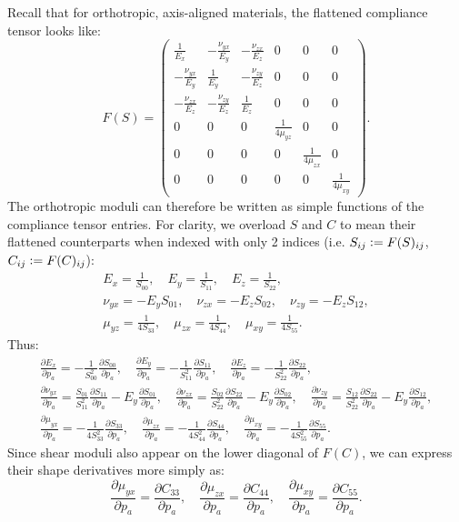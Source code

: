 \documentclass[10pt]{article}
\providecommand{\pder}[2]{\frac{\partial #1}{\partial #2}}
\newcommand{\defeq}{\vcentcolon=}
\begin{document}
Recall that for orthotropic, axis-aligned materials, the flattened compliance
tensor looks like:
$$
F(S) = \begin{pmatrix}
    \frac{1}{E_x} & -\frac{\nu_{yx}}{E_y} & -\frac{\nu_{zx}}{E_z} & 0 & 0 & 0 \\
    -\frac{\nu_{yx}}{E_y} & \frac{1}{E_y} & -\frac{\nu_{zy}}{E_z} & 0 & 0 & 0 \\
    -\frac{\nu_{zx}}{E_z} & -\frac{\nu_{zy}}{E_z} & \frac{1}{E_z} & 0 & 0 & 0 \\
    0 & 0 & 0 & \frac{1}{4 \mu_{yz}} & 0 & 0 \\
    0 & 0 & 0 & 0 & \frac{1}{4 \mu_{zx}} & 0 \\
    0 & 0 & 0 & 0 & 0 & \frac{1}{4 \mu_{xy}}
\end{pmatrix}.
$$
The orthotropic moduli can therefore be written as simple functions of the
compliance tensor entries. For clarity, we overload $S$ and $C$ to mean their
flattened counterparts when indexed with only 2 indices (i.e. $S_{ij} \defeq
F(S)_{ij}$, $C_{ij} \defeq F(C)_{ij}$):
\begin{gather*}
E_x = \frac{1}{S_{00}}, \quad
E_y = \frac{1}{S_{11}}, \quad
E_z = \frac{1}{S_{22}}, \\
\nu_{yx} = -E_y S_{01}, \quad
\nu_{zx} = -E_z S_{02}, \quad
\nu_{zy} = -E_z S_{12}, \\
\mu_{yz} = \frac{1}{4 S_{33}}, \quad
\mu_{zx} = \frac{1}{4 S_{44}}, \quad
\mu_{xy} = \frac{1}{4 S_{55}}.
\end{gather*}
Thus:
\begin{gather*}
    \pder{E_x}{p_a} = -\frac{1}{S_{00}^2} \pder{S_{00}}{p_a}, \quad
    \pder{E_y}{p_a} = -\frac{1}{S_{11}^2} \pder{S_{11}}{p_a}, \quad
    \pder{E_z}{p_a} = -\frac{1}{S_{22}^2} \pder{S_{22}}{p_a}, \\
    \pder{\nu_{yx}}{p_a} = \frac{S_{01}}{S_{11}^2} \pder{S_{11}}{p_a} - E_y \pder{S_{01}}{p_a}, \quad
    \pder{\nu_{zx}}{p_a} = \frac{S_{02}}{S_{22}^2} \pder{S_{22}}{p_a} - E_y \pder{S_{02}}{p_a}, \quad
    \pder{\nu_{zy}}{p_a} = \frac{S_{12}}{S_{22}^2} \pder{S_{22}}{p_a} - E_y \pder{S_{12}}{p_a}, \\
    \pder{\mu_{yx}}{p_a} = -\frac{1}{4 S_{33}^2} \pder{S_{33}}{p_a}, \quad
    \pder{\mu_{zx}}{p_a} = -\frac{1}{4 S_{44}^2} \pder{S_{44}}{p_a}, \quad
    \pder{\mu_{xy}}{p_a} = -\frac{1}{4 S_{55}^2} \pder{S_{55}}{p_a}.
\end{gather*}
Since shear moduli also appear on the lower diagonal of $F(C)$, we can express
their shape derivatives more simply as:
$$
    \pder{\mu_{yx}}{p_a} = \pder{C_{33}}{p_a}, \quad
    \pder{\mu_{zx}}{p_a} = \pder{C_{44}}{p_a}, \quad
    \pder{\mu_{xy}}{p_a} = \pder{C_{55}}{p_a}.
$$
\end{document}
